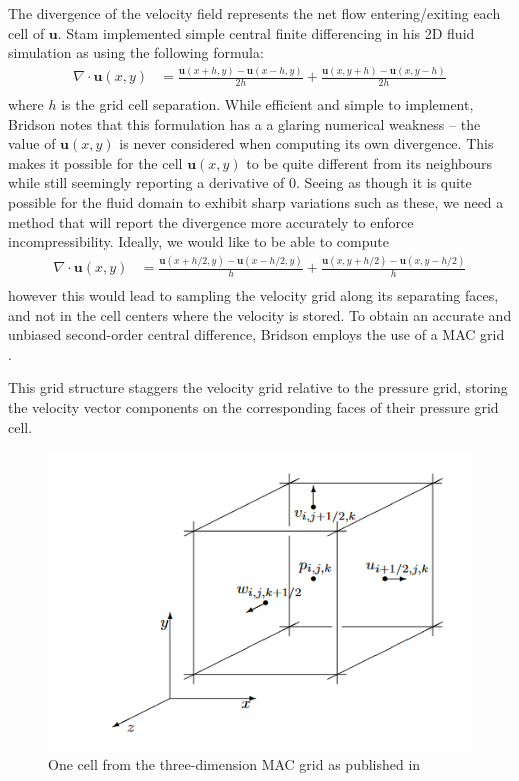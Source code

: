 \documentclass[a4paper, 11pt, titlepage]{article}
\begin{document}
The divergence of the velocity field represents the net flow entering/exiting
each cell of $\bm{u}$. Stam implemented simple central finite differencing in
his 2D fluid simulation as using the following formula:
\begin{align*}
    \nabla \cdot \bm{u}(x, y) &= \frac{\bm{u}(x + h, y) - \bm{u}(x - h, y)}{2h} + \frac{\bm{u}(x, y + h) - \bm{u}(x, y - h)}{2h}\\
\end{align*}
where $h$ is the grid cell separation. While efficient and simple to implement,
Bridson notes that this formulation has a a glaring numerical weakness \cite{bridsonbook} -- the
value of $\bm{u}(x, y)$ is never considered when computing its own divergence.
This makes it possible for the cell $\bm{u}(x, y)$ to be quite different from
its neighbours while still seemingly reporting a derivative of 0. Seeing as
though it is quite possible for the fluid domain to exhibit sharp variations
such as these, we need a method that will report the divergence more accurately
to enforce incompressibility. Ideally, we would like to be able to compute
\begin{align*}
    \nabla \cdot \bm{u}(x, y) &= \frac{\bm{u}(x + h/2, y) - \bm{u}(x - h/2, y)}{h} + \frac{\bm{u}(x, y + h/2) - \bm{u}(x, y - h/2)}{h}\\
\end{align*}
however this would lead to sampling the velocity grid along its separating
faces, and not in the cell centers where the velocity is stored.
To obtain an accurate and unbiased second-order central difference, Bridson employs
the use of a MAC grid \cite{harlow1965numerical}.

This grid structure staggers the velocity grid relative to the pressure grid, storing
the velocity vector components on the corresponding faces of their pressure grid cell.

\begin{figure}[H]
  \centering
  \includegraphics[width=0.5\linewidth]{MAC grid.png}
  \caption{One cell from the three-dimension MAC grid as published in \cite{bridsonbook}}
\end{figure}
\end{document}
